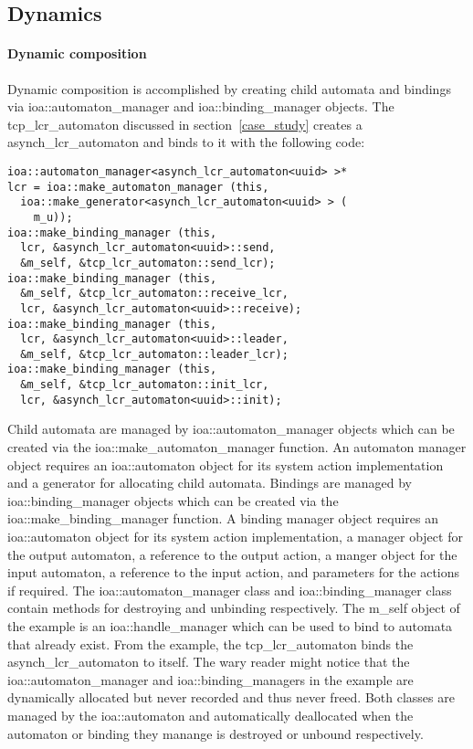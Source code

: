 \subsection{Dynamics\label{dynamic_composition}}

\paragraph*{Dynamic composition}
Dynamic composition is accomplished by creating child automata and bindings via ioa::automaton\_manager and ioa::binding\_manager objects.
\ifjournal
The tcp\_lcr\_automaton discussed in section~\ref{case_study} creates a asynch\_lcr\_automaton and binds to it with the following code:
\begin{lstlisting}
ioa::automaton_manager<asynch_lcr_automaton<uuid> >*
lcr = ioa::make_automaton_manager (this,
  ioa::make_generator<asynch_lcr_automaton<uuid> > (
    m_u));
ioa::make_binding_manager (this,
  lcr, &asynch_lcr_automaton<uuid>::send,
  &m_self, &tcp_lcr_automaton::send_lcr);
ioa::make_binding_manager (this,
  &m_self, &tcp_lcr_automaton::receive_lcr,
  lcr, &asynch_lcr_automaton<uuid>::receive);
ioa::make_binding_manager (this,
  lcr, &asynch_lcr_automaton<uuid>::leader,
  &m_self, &tcp_lcr_automaton::leader_lcr);
ioa::make_binding_manager (this,
  &m_self, &tcp_lcr_automaton::init_lcr,
  lcr, &asynch_lcr_automaton<uuid>::init);
\end{lstlisting}
\fi
Child automata are managed by ioa::automaton\_manager objects which can be created via the ioa::make\_automaton\_manager function.
An automaton manager object requires an ioa::automaton object for its system action implementation and a generator for allocating child automata.
Bindings are managed by ioa::binding\_manager objects which can be created via the ioa::make\_binding\_manager function.
A binding manager object requires an ioa::automaton object for its system action implementation, a manager object for the output automaton, a reference to the output action, a manger object for the input automaton, a reference to the input action, and parameters for the actions if required.
The ioa::automaton\_manager class and ioa::binding\_manager class contain methods for destroying and unbinding respectively.
\ifjournal
The m\_self object of the example is an ioa::handle\_manager which can be used to bind to automata that already exist.
From the example, the tcp\_lcr\_automaton binds the asynch\_lcr\_automaton to itself.
The wary reader might notice that the ioa::automaton\_manager and ioa::binding\_managers in the example are dynamically allocated but never recorded and thus never freed.
Both classes are managed by the ioa::automaton and automatically deallocated when the automaton or binding they manange is destroyed or unbound respectively.
\fi

